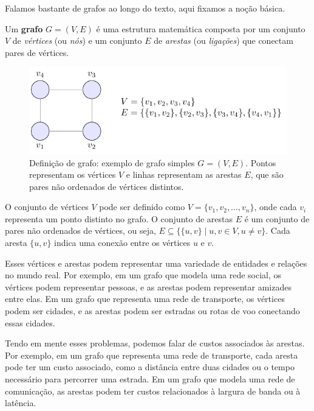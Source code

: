 Falamos bastante de grafos ao longo do texto, aqui fixamos a noção básica.


Um \textbf{grafo} \(G = (V, E)\) é uma estrutura matemática composta por um conjunto \(V\) de \emph{vértices} (ou \emph{nós}) e um conjunto \(E\) de \emph{arestas} (ou \emph{ligações}) que conectam pares de vértices.


\begin{figure}[H]
	\centering
	\includegraphics[width=0.9\linewidth]{figures/fig_def_grafo.pdf}

	\caption{Definição de grafo: exemplo de grafo simples \(G=(V,E)\). Pontos representam os vértices \(V\) e linhas representam as arestas \(E\), que são pares não ordenados de vértices distintos.}
	\label{fig:def-grafo}\end{figure}



O conjunto de vértices \(V\) pode ser definido como \(V = \{v_1, v_2, \ldots, v_n\}\), onde cada \(v_i\) representa um ponto distinto no grafo. O conjunto de arestas \(E\) é um conjunto de pares não ordenados de vértices, ou seja, \(E \subseteq \{\{u, v\} \mid u, v \in V, u \neq v\}\). Cada aresta \(\{u, v\}\) indica uma conexão entre os vértices \(u\) e \(v\).


Esses vértices e arestas podem representar uma variedade de entidades e relações no mundo real. Por exemplo, em um grafo que modela uma rede social, os vértices podem representar pessoas, e as arestas podem representar amizades entre elas. Em um grafo que representa uma rede de transporte, os vértices podem ser cidades, e as arestas podem ser estradas ou rotas de voo conectando essas cidades.


Tendo em mente esses problemas, podemos falar de custos associados às arestas. Por exemplo, em um grafo que representa uma rede de transporte, cada aresta pode ter um custo associado, como a distância entre duas cidades ou o tempo necessário para percorrer uma estrada. Em um grafo que modela uma rede de comunicação, as arestas podem ter custos relacionados à largura de banda ou à latência.


